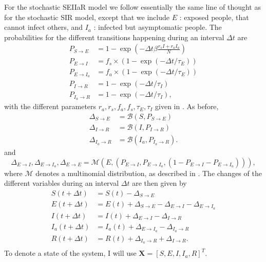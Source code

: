 For the stochastic SEIIaR model we follow essentially the same line of thought as for the stochastic SIR model, except that we include $E$ : exposed people, that cannot infect others, and $I_a$ : infected but asymptomatic people. The probabilities for the different transitions happening during an interval $\Delta t$ are
\begin{subequations}
	\begin{align}
		P_{S\to E} &= 1- \exp{\left(-\Delta t \beta \frac{r_s I + r_a I_a}{N}\right)} \\
		P_{E\to I} &=  f_s \times (1- \exp{(-\Delta t /\tau_E)}) \\
		P_{E\to I_a} &= f_a \times (1- \exp{(-\Delta t/\tau_E)}) \\
		P_{I\to R} &= 1- \exp{(-\Delta t /\tau_I)} \\
		P_{I_a\to R} &= 1- \exp{(-\Delta t/\tau_I)}, 
	\end{align}
\end{subequations}
with the different parameters $r_a,r_s,f_a,f_s,\tau_E,\tau_I$ given in \cite{sheet}. As before, 
\begin{subequations}
	\begin{align*}
		\Delta_{S\to E  } &= \mathcal{B}(S,P_{S \to E}) \\
		\Delta_{I\to R  } &= \mathcal{B}(I,P_{I \to R}) \\
		\Delta_{I_a\to R} &= \mathcal{B}(I_a,P_{I_a \to R}).
	\end{align*}
\end{subequations}
and 
\begin{equation}
	\Delta_{E \to I}, \Delta_{E \to I_a}, \Delta_{E \to E} = \mathcal{M}(E,(P_{E\to I},P_{E\to I_a}, (1- P_{E\to I} - P_{E\to I_a}))),
\end{equation}
where $\mathcal{M}$ denotes a multinomial distribution, as described in \cite{sheet}. The changes of the different variables during an interval $\Delta t$ are then given by
\begin{subequations}
	\begin{align}
		S(t + \Delta t) &= S(t) - \Delta_{S\to E} \\
		E(t + \Delta t) &= E(t) + \Delta_{S\to E} - \Delta_{E\to I} - \Delta_{E \to I_a} \\
		I(t + \Delta t) &= I(t) + \Delta_{E\to I} - \Delta_{I\to R} \\
		I_a(t + \Delta t) &= I_a(t) + \Delta_{E\to I_a} - \Delta_{I_a\to R} \\
		R(t + \Delta t) &= R(t) + \Delta_{I_a \to R} + \Delta_{I \to R}. \\
	\end{align}
\end{subequations}
To denote a state of the system, I will use $\mathbf{X} = [S,E,I,I_a,R]^T$. 

\vspace{2cm}